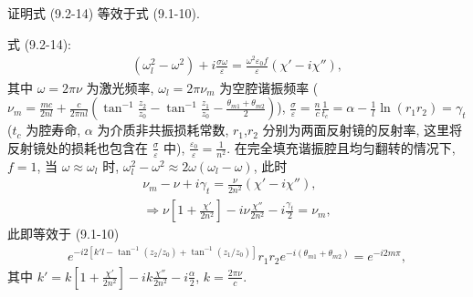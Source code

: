 \documentclass[twoside]{note}
\begin{document}
\begin{exe}
    证明式 (9.2-14) 等效于式 (9.1-10).
\end{exe}
\begin{pf}
    式 (9.2-14):
    \begin{align}
        (\omega_l^2-\omega^2)+i\frac{\sigma\omega}{\varepsilon}=\frac{\omega^2\varepsilon_0f}{\varepsilon}(\chi'-i\chi''),
    \end{align}
    其中 $\omega=2\pi\nu$ 为激光频率, $\omega_l=2\pi\nu_m$ 为空腔谐振频率 ($\nu_m=\frac{mc}{2nl}+\frac{c}{2\pi nl}\left(\tan^{-1}\frac{z_2}{z_0}-\tan^{-1}\frac{z_1}{z_0}-\frac{\theta_{m1}+\theta_{m2}}{2}\right)$), $\frac{\sigma}{\varepsilon}=\frac{n}{c}\frac{1}{t_c}=\alpha-\frac{1}{l}\ln(r_1r_2)=\gamma_t$ ($t_c$ 为腔寿命, $\alpha$ 为介质非共振损耗常数, $r_1$,$r_2$ 分别为两面反射镜的反射率, 这里将反射镜处的损耗也包含在 $\frac{\sigma}{\varepsilon}$ 中), $\frac{\varepsilon_0}{\varepsilon}=\frac{1}{n^2}$.
    在完全填充谐振腔且均匀翻转的情况下, $f=1$, 当 $\omega\approx\omega_l$ 时, $\omega_l^2-\omega^2\approx 2\omega(\omega_l-\omega)$, 此时
    \begin{gather}
        \nu_m-\nu+i\gamma_t=\frac{\nu}{2n^2}(\chi'-i\chi''),\\
        \Longrightarrow\nu\left[1+\frac{\chi'}{2n^2}\right]-i\nu\frac{\chi''}{2n^2}-i\frac{\gamma_t}{2}=\nu_m,
    \end{gather}
    此即等效于 (9.1-10)
    \begin{align}
        e^{-i2[k'l-\tan^{-1}(z_2/z_0)+\tan^{-1}(z_1/z_0)]}r_1r_2e^{-i(\theta_{m1}+\theta_{m2})}=e^{-i2m\pi},
    \end{align}
    其中 $k'=k\left[1+\frac{\chi'}{2n^2}\right]-ik\frac{\chi''}{2n^2}-i\frac{\alpha}{2}$, $k=\frac{2\pi\nu}{c}$.
\end{pf}
\end{document}
